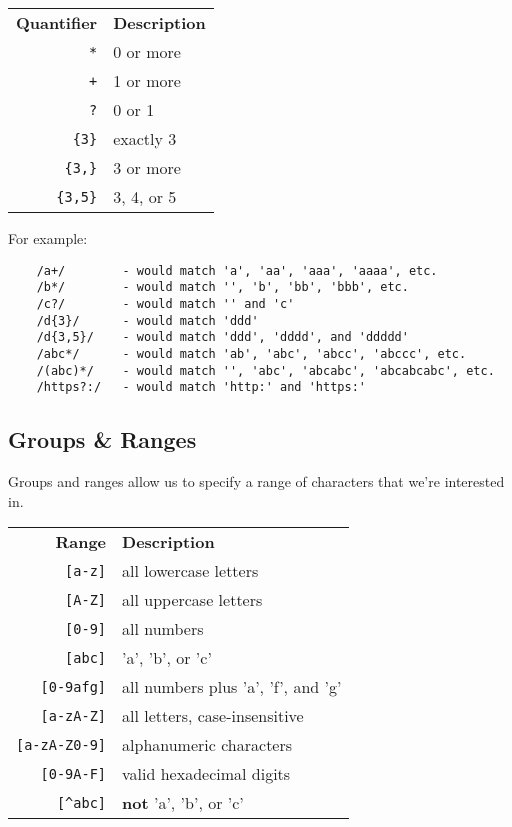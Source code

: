 \begin{center}
    \begin{small}
        \begin{tabu}{r l}
            \textbf{Quantifier}   & \textbf{Description} \\
            \texttt{*}          & 0 or more \\
            \texttt{+}          & 1 or more \\
            \texttt{?}          & 0 or 1 \\
            \texttt{\{3\}}      & exactly 3 \\
            \texttt{\{3,\}}     & 3 or more \\
            \texttt{\{3,5\}}   & 3, 4, or 5
        \end{tabu}
    \end{small}
\end{center}

For example:

\begin{verbatim}
    /a+/        - would match 'a', 'aa', 'aaa', 'aaaa', etc.
    /b*/        - would match '', 'b', 'bb', 'bbb', etc.
    /c?/        - would match '' and 'c'
    /d{3}/      - would match 'ddd'
    /d{3,5}/    - would match 'ddd', 'dddd', and 'ddddd'
    /abc*/      - would match 'ab', 'abc', 'abcc', 'abccc', etc.
    /(abc)*/    - would match '', 'abc', 'abcabc', 'abcabcabc', etc.
    /https?:/   - would match 'http:' and 'https:'
\end{verbatim}


\subsection{Groups \& Ranges}

Groups and ranges allow us to specify a range of characters that we're interested in.

\begin{center}
    \begin{small}
        \begin{tabu}{r l}
            \textbf{Range}          & \textbf{Description} \\
            \texttt{[a-z]}          & all lowercase letters \\
            \texttt{[A-Z]}          & all uppercase letters \\
            \texttt{[0-9]}          & all numbers \\
            \texttt{[abc]}          & 'a', 'b', or 'c' \\
            \texttt{[0-9afg]}       & all numbers plus 'a', 'f', and 'g' \\
            \texttt{[a-zA-Z]}       & all letters, case-insensitive \\
            \texttt{[a-zA-Z0-9]}    & alphanumeric characters \\
            \texttt{[0-9A-F]}       & valid hexadecimal digits \\
            \texttt{[\textasciicircum abc]}         & \textbf{not} 'a', 'b', or 'c'
        \end{tabu}
    \end{small}
\end{center}

